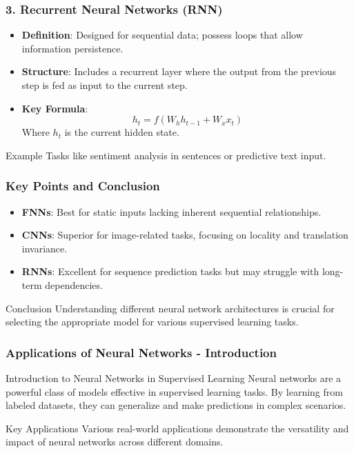 \documentclass[aspectratio=169]{beamer}
\begin{document}
\begin{frame}[fragile]
    \frametitle{3. Recurrent Neural Networks (RNN)}
    \begin{itemize}
        \item \textbf{Definition}: Designed for sequential data; possess loops that allow information persistence.
        \item \textbf{Structure}: Includes a recurrent layer where the output from the previous step is fed as input to the current step.
        \item \textbf{Key Formula}:
        \begin{equation}
            h_t = f(W_h h_{t-1} + W_x x_t)
        \end{equation}
        Where \( h_t \) is the current hidden state.
    \end{itemize}
    \begin{block}{Example}
        Tasks like sentiment analysis in sentences or predictive text input. 
    \end{block}
\end{frame}

\begin{frame}[fragile]
    \frametitle{Key Points and Conclusion}
    \begin{itemize}
        \item \textbf{FNNs}: Best for static inputs lacking inherent sequential relationships.
        \item \textbf{CNNs}: Superior for image-related tasks, focusing on locality and translation invariance.
        \item \textbf{RNNs}: Excellent for sequence prediction tasks but may struggle with long-term dependencies.
    \end{itemize}
    \begin{block}{Conclusion}
        Understanding different neural network architectures is crucial for selecting the appropriate model for various supervised learning tasks.
    \end{block}
\end{frame}

\begin{frame}[fragile]
    \frametitle{Applications of Neural Networks - Introduction}
    
    \begin{block}{Introduction to Neural Networks in Supervised Learning}
        Neural networks are a powerful class of models effective in supervised learning tasks. By learning from labeled datasets, they can generalize and make predictions in complex scenarios. 
    \end{block}
    
    \begin{block}{Key Applications}
        Various real-world applications demonstrate the versatility and impact of neural networks across different domains.
    \end{block}
\end{frame}
\end{document}
